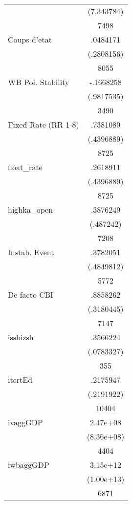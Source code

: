 {\begin{longtable}{l*{1}{c}}
                    &  (7.343784)\\
                    &        7498\\
Coups d'etat        &    .0484171\\
                    &  (.2808156)\\
                    &        8055\\
WB Pol. Stability   &   -.1668258\\
                    &  (.9817535)\\
                    &        3490\\
Fixed Rate (RR 1-8) &    .7381089\\
                    &  (.4396889)\\
                    &        8725\\
float\_rate          &    .2618911\\
                    &  (.4396889)\\
                    &        8725\\
highka\_open         &    .3876249\\
                    &   (.487242)\\
                    &        7208\\
Instab. Event       &    .3782051\\
                    &  (.4849812)\\
                    &        5772\\
De facto CBI        &    .8858262\\
                    &  (.3180445)\\
                    &        7147\\
issbizsh            &    .3566224\\
                    &  (.0783327)\\
                    &         355\\
itertEd             &    .2175947\\
                    &  (.2191922)\\
                    &       10404\\
ivaggGDP            &    2.47e+08\\
                    &  (8.36e+08)\\
                    &        4404\\
iwbaggGDP           &    3.15e+12\\
                    &  (1.00e+13)\\
                    &        6871\\

\end{longtable}}

